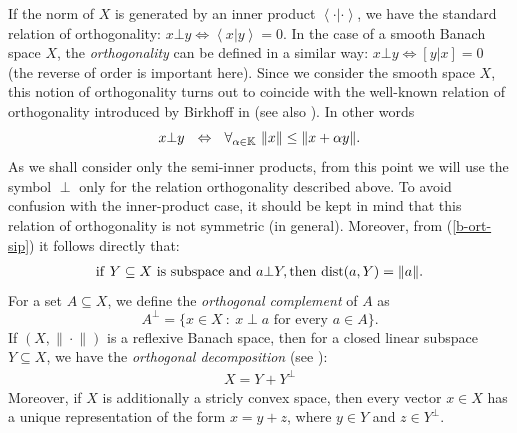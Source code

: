 \documentclass[12pt, reqno]{amsart}
\theoremstyle{definition}
\theoremstyle{remark}
\numberwithin{equation}{section}
\newcommand{\K}{\mbox{$\mathbb{K}$}}
\newcommand{\ip}[2]{\left\langle#1|#2\right\rangle}
\newcommand{\sip}[2]{\left[#1|#2\right]}
\begin{document}
If the norm of $X$ is generated by an inner product $\ip{\cdot}{\cdot}$, we have the standard relation of orthogonality: $x\bot y \Leftrightarrow \ip{x}{y}=0$. In the case of a smooth Banach space $X$, the {\it orthogonality} can be defined in a similar way: $x\bot y \Leftrightarrow \sip{y}{x}=0$ (the reverse of order is important here). Since we consider the smooth space $X$, this notion of orthogonality turns out to coincide with the well-known relation of orthogonality introduced by Birkhoff in \cite{birkhoff} (see also \cite{james}). In other words
\begin{equation}\label{b-ort-sip}
x\bot y\ \ \Leftrightarrow \ \ \forall_{\alpha\in\begin{footnotesize} \K
\end{footnotesize}}\ \|x\|\leq\|x+\alpha y\|.
\end{equation}
As we shall consider only the semi-inner products, from this point we will use the symbol $\perp$ only for the relation orthogonality described above. To avoid confusion with the inner-product case, it should be kept in mind that this relation of orthogonality is not symmetric (in general).
Moreover, from (\ref{b-ort-sip}) it follows directly that:
\begin{align}\label{property-ort-dist}
{\rm if}\ Y\subseteq X\ {\rm is\ subspace\ and}\ a\bot Y, {\rm then}\ {\rm dist}(a,Y)=\|a\| .   
\end{align}
For a set $A \subseteq X$, we define the {\it orthogonal complement} of $A$ as 
$$A^{\perp} = \{ x \in X \ : \ x \perp a \text{ for every } a \in A\}.$$
If $(X, \|\!\cdot\!\|)$ is a reflexive Banach space, then for a
closed linear subspace $Y \subseteq X$, we have the {\it orthogonal decomposition} (see \cite[p. 163, 164]{dragomir-sip}):
\begin{align}\label{theorem-b-decomposition}
X=Y + Y^{\bot}
\end{align}
Moreover, if $X$ is additionally a stricly convex space, then every vector $x \in X$ has a unique representation of the form $x=y+z$, where $y \in Y$ and $z \in Y^{\bot}$. 
\end{document}
